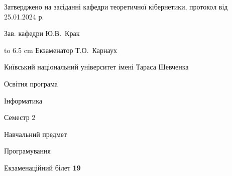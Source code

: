\documentclass[12pt, ukrainian]{article}
\begin{document}
{\smallskip\smallskip \begin {scriptsize} Затверджено на засіданні кафедри теоретичної кібернетики, протокол   від   25.01.2024 р.\par\smallskip\smallskip\smallskip\smallskip
{\parbox {6.5 cm} {Зав. кафедри \dotfill Ю.В.~Крак}}\hspace {0.7cm} {\hbox to 6.5 cm { Екзаменатор \dotfill Т.О.~Карнаух}} \end{scriptsize}}
\newpage
{{\begin {scriptsize}\par
{ \center  Київський національний університет імені Тараса Шевченка \par}
{\parbox {5 cm}{Освітня програма \hfill}{\parbox {7 cm}{Інформатика\hfill}}\parbox {6 cm}{\hfill Семестр 2}}\par
{\parbox {5 cm} {Навчальний предмет \hfill}\parbox {7 cm}{Програмування \hfill}\parbox {6cm}{\hfill}\par}\vspace{-15pt} \end{scriptsize}}{\center Екзаменаційний білет \No \textbf { 19 }\par}}
\end{document}
